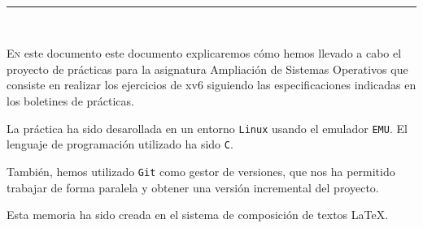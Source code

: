 
\begin{center}
	{\fboxrule=4pt } \\
	\rule{15cm}{0pt} \\
\end{center}

 
 \lettrine[lines=3, depth = 0]{E}{n} este documento este documento explicaremos cómo hemos llevado a 
 cabo el proyecto de prácticas para la asignatura 
 Ampliación de Sistemas Operativos que consiste en realizar los ejercicios de xv6 siguiendo las 
 especificaciones indicadas en los boletines de prácticas.
 
 \par La práctica ha sido desarollada en un entorno \texttt{Linux} usando el emulador \texttt{EMU}. El lenguaje de
 programación utilizado ha sido \texttt{C}. 

 \par También, hemos utilizado \texttt{Git} como gestor de versiones, que nos ha permitido
 trabajar de forma paralela y obtener una versión incremental del proyecto.

 \par Esta memoria ha sido creada en el sistema de composición de textos \LaTeX.


\newpage
{}